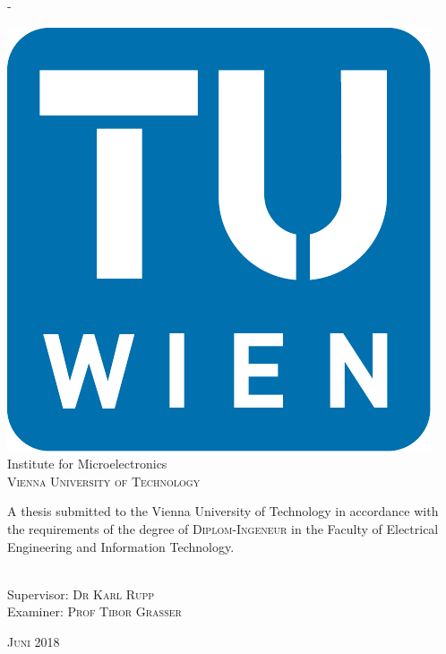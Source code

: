 \begin{titlingpage}
\begin{SingleSpace}
\begin{adjustwidth*}{\unitlength}{-\unitlength}
\begin{center}
\includegraphics[scale=0.5]{logos/TU_Signet}\\
\vspace{6mm}
{\large Institute for Microelectronics\\
\textsc{Vienna University of Technology}}\\
\vspace{11mm}
\begin{minipage}{12cm}
A thesis submitted to the Vienna University of Technology in accordance with the requirements of the degree of \textsc{Diplom-Ingeneur} in the Faculty of Electrical Engineering and Information Technology.
\end{minipage}\\
\vspace*{7mm}
{Supervisor: \textsc{Dr Karl Rupp}\\
Examiner: \textsc{Prof Tibor Grasser}}

\vspace{5mm}
{\large\textsc{Juni 2018}}
\vspace{12mm}
\end{center}
\begin{flushright}
\end{flushright}
\end{adjustwidth*}
\end{SingleSpace}
\end{titlingpage}